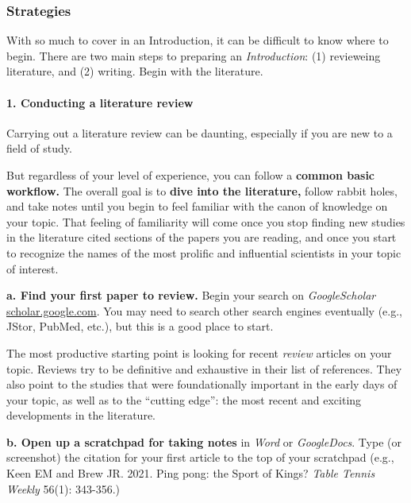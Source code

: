 \documentclass[
]{book}
\begin{document}
\hypertarget{strategies-1}{%
\subsubsection*{Strategies}\label{strategies-1}}

With so much to cover in an Introduction, it can be difficult to know where to begin. There are two main steps to preparing an \emph{Introduction}: (1) revieweing literature, and (2) writing. Begin with the literature.

\hypertarget{conducting-a-literature-review}{%
\paragraph{1. Conducting a literature review}\label{conducting-a-literature-review}}

Carrying out a literature review can be daunting, especially if you are new to a field of study.

But regardless of your level of experience, you can follow a \textbf{common basic workflow.} The overall goal is to \textbf{dive into the literature,} follow rabbit holes, and take notes until you begin to feel familiar with the canon of knowledge on your topic. That feeling of familiarity will come once you stop finding new studies in the literature cited sections of the papers you are reading, and once you start to recognize the names of the most prolific and influential scientists in your topic of interest.

\textbf{a. Find your first paper to review.} Begin your search on \emph{GoogleScholar} \url{scholar.google.com}. You may need to search other search engines eventually (e.g., JStor, PubMed, etc.), but this is a good place to start.

The most productive starting point is looking for recent \emph{review} articles on your topic. Reviews try to be definitive and exhaustive in their list of references. They also point to the studies that were foundationally important in the early days of your topic, as well as to the ``cutting edge'': the most recent and exciting developments in the literature.

\textbf{b. Open up a scratchpad for taking notes} in \emph{Word} or \emph{GoogleDocs}. Type (or screenshot) the citation for your first article to the top of your scratchpad (e.g., Keen EM and Brew JR. 2021. Ping pong: the Sport of Kings? \emph{Table Tennis Weekly} 56(1): 343-356.)
\end{document}
